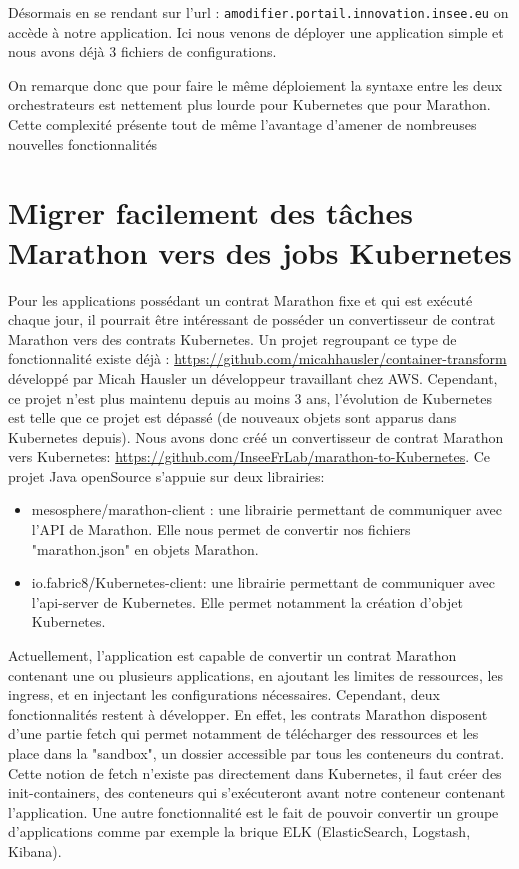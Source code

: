 \documentclass[11pt,fleqn]{book} %
\begin{document}
Désormais en se rendant sur l'url : \texttt{amodifier.portail.innovation.insee.eu} on accède à notre application. Ici nous venons de déployer une application simple et nous avons déjà 3 fichiers de configurations.\newline

On remarque donc que pour faire le même déploiement la syntaxe entre les deux orchestrateurs est nettement plus lourde pour Kubernetes que pour Marathon. Cette complexité présente tout de même l'avantage d'amener de nombreuses nouvelles fonctionnalités


\section*{Migrer facilement des tâches Marathon vers des jobs Kubernetes}
Pour les applications possédant un contrat Marathon fixe et qui est exécuté chaque jour, il pourrait être intéressant de posséder un convertisseur de contrat Marathon vers des contrats Kubernetes. Un projet regroupant ce type de fonctionnalité existe déjà : \url{https://github.com/micahhausler/container-transform} développé par Micah Hausler un développeur travaillant chez AWS. Cependant, ce projet n'est plus maintenu depuis au moins 3 ans, l'évolution de Kubernetes est telle que ce projet est dépassé (de nouveaux objets sont apparus dans Kubernetes depuis). Nous avons donc créé un convertisseur de contrat Marathon vers Kubernetes: \url{https://github.com/InseeFrLab/marathon-to-Kubernetes}. Ce projet Java openSource s'appuie sur deux librairies: \begin{itemize}
    \item mesosphere/marathon-client : une librairie permettant de communiquer avec l'API de Marathon. Elle nous permet de convertir nos fichiers "marathon.json" en objets Marathon.
    \item io.fabric8/Kubernetes-client: une librairie permettant de communiquer avec l'api-server de Kubernetes. Elle permet notamment la création d'objet Kubernetes.\newline 
\end{itemize}

Actuellement, l'application est capable de convertir un contrat Marathon contenant une ou plusieurs applications, en ajoutant les limites de ressources, les ingress, et en injectant les configurations nécessaires. Cependant, deux fonctionnalités restent à développer. En effet, les contrats Marathon disposent d'une partie fetch qui permet notamment de télécharger des ressources et les place dans la "sandbox", un dossier accessible par tous les conteneurs du contrat. Cette notion de fetch n'existe pas directement dans Kubernetes, il faut créer des init-containers, des conteneurs qui s'exécuteront avant notre conteneur contenant l'application. Une autre fonctionnalité est le fait de pouvoir convertir un groupe d'applications comme par exemple la brique ELK (ElasticSearch, Logstash, Kibana).\newline
\end{document}
